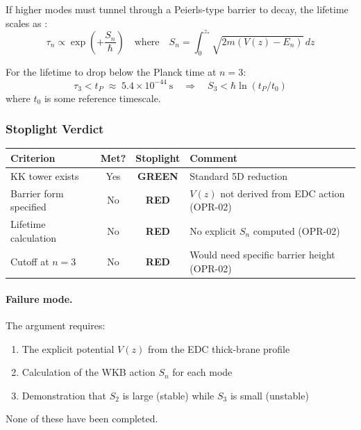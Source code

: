 If higher modes must tunnel through a Peierls-type barrier to decay, the
lifetime scales as \tagP{}:
\begin{equation}
    \tau_n \propto \exp\left(+\frac{S_n}{\hbar}\right)
    \quad\text{where}\quad
    S_n = \int_0^{z_*} \sqrt{2m(V(z) - E_n)} \, dz
    \label{eq:ch5_lifetime}
\end{equation}

For the lifetime to drop below the Planck time at $n = 3$:
\begin{equation}
    \tau_3 < t_P \;\approx\; 5.4 \times 10^{-44}~\text{s}
    \quad\Longrightarrow\quad
    S_3 < \hbar \ln(t_P / t_0)
    \label{eq:ch5_truncation_cond}
\end{equation}
where $t_0$ is some reference timescale.

\subsubsection{Stoplight Verdict}

\begin{center}
\small
\begin{tabular}{p{3cm}ccp{5cm}}
\toprule
\textbf{Criterion} & \textbf{Met?} & \textbf{Stoplight} & \textbf{Comment} \\
\midrule
KK tower exists & Yes & \textcolor{green!50!black}{\textbf{GREEN}} & Standard 5D reduction \tagBL{} \\
Barrier form specified & No & \textcolor{red!80!black}{\textbf{RED}} & $V(z)$ not derived from EDC action (OPR-02) \\
Lifetime calculation & No & \textcolor{red!80!black}{\textbf{RED}} & No explicit $S_n$ computed (OPR-02) \\
Cutoff at $n = 3$ & No & \textcolor{red!80!black}{\textbf{RED}} & Would need specific barrier height (OPR-02) \\
\bottomrule
\end{tabular}
\end{center}

\paragraph{Failure mode.}
The argument requires:
\begin{enumerate}[nosep]
    \item The explicit potential $V(z)$ from the EDC thick-brane profile
    \item Calculation of the WKB action $S_n$ for each mode
    \item Demonstration that $S_2$ is large (stable) while $S_3$ is small (unstable)
\end{enumerate}
None of these have been completed.

